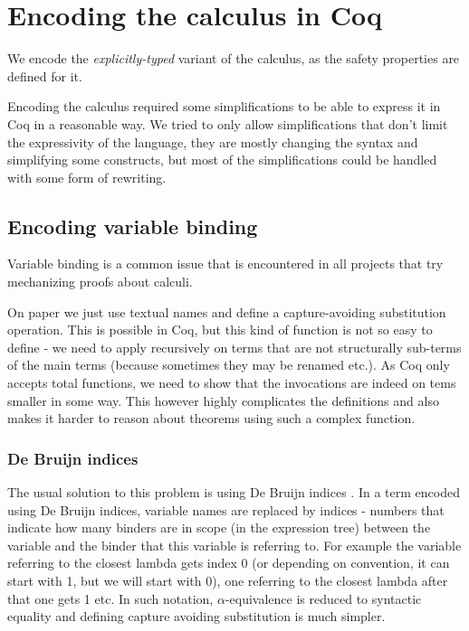 \documentclass[runningheads]{article}
\begin{document}
\section{Encoding the calculus in Coq}
We encode the \textit{explicitly-typed} variant of the calculus, as the safety properties are defined for it.

Encoding the calculus required some simplifications to be able to express it in Coq in a reasonable way. We tried to only allow simplifications that don't limit the expressivity of the language, they are mostly changing the syntax and simplifying some constructs, but most of the simplifications could be handled with some form of rewriting.

\subsection{Encoding variable binding}

Variable binding is a common issue that is encountered in all projects that try mechanizing proofs about calculi. 

On paper we just use textual names and define a capture-avoiding substitution operation. This is possible in Coq, but this kind of function is not so easy to define - we need to apply recursively on terms that are not structurally sub-terms of the main terms (because sometimes they may be renamed etc.). As Coq only accepts total functions, we need to show that the invocations are indeed on tems smaller in some way. This however highly complicates the definitions and also makes it harder to reason about theorems using such a complex function.

\subsubsection{De Bruijn indices}

The usual solution to this problem is using De Bruijn indices \cite{Bruijn1972LambdaCN}. In a term encoded using De Bruijn indices, variable names are replaced by indices - numbers that indicate how many binders are in scope (in the expression tree) between the variable and the binder that this variable is referring to. For example the variable referring to the closest lambda gets index 0 (or depending on convention, it can start with 1, but we will start with 0), one referring to the closest lambda after that one gets 1 etc. In such notation, $\alpha$-equivalence is reduced to syntactic equality and defining capture avoiding substitution is much simpler.
\end{document}
